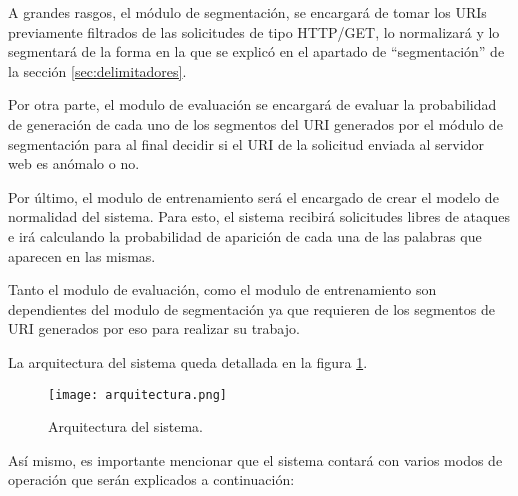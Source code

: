 A grandes rasgos, el módulo de segmentación, se encargará de tomar los URIs previamente filtrados de las solicitudes de tipo HTTP/GET, lo normalizará y lo segmentará de la forma en la que se explicó en el apartado de ``segmentación'' de la sección \ref{sec:delimitadores}.

Por otra parte, el modulo de evaluación se encargará de evaluar la probabilidad de generación de cada uno de los segmentos del URI generados por el módulo de segmentación para al final decidir si el URI de la solicitud enviada al servidor web es anómalo o no.

Por último, el modulo de entrenamiento será el encargado de crear el modelo de normalidad del sistema. Para esto, el sistema recibirá solicitudes libres de ataques e irá calculando la probabilidad de aparición de cada una de las palabras que aparecen en las mismas.

Tanto el modulo de evaluación, como el modulo de entrenamiento son dependientes del modulo de segmentación ya que requieren de los segmentos de URI generados por eso para realizar su trabajo. 

La arquitectura del sistema queda detallada en la figura \ref{fig:arquitectura}.

\begin{figure}[tb]
\begin{center}
\texttt{[image: arquitectura.png]}
\caption{Arquitectura del sistema.}
\label{fig:arquitectura}
\end{center}
\end{figure}


Así mismo, es importante mencionar que el sistema contará con varios modos de operación que serán explicados a continuación:

